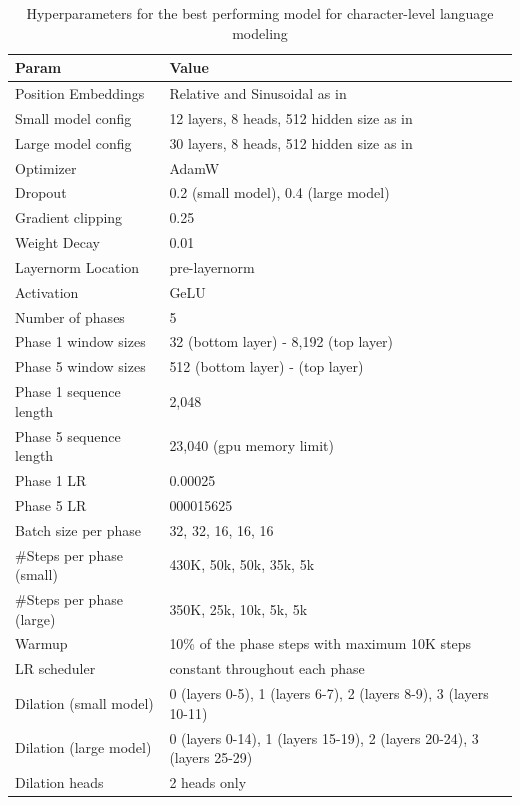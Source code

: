 \begin{table}
 \centering
 \small
\begin{tabular}{@{}ll@{}}
\toprule
Param & Value \\
\midrule
Position Embeddings & Relative and Sinusoidal as in~\citet{transformerxl} \\
Small model config & 12 layers, 8 heads, 512 hidden size as in~\citet{transformerxl} \\
Large model config & 30 layers, 8 heads, 512 hidden size as in~\citet{sparseOpenai} \\
Optimizer & AdamW \\
Dropout & 0.2 (small model), 0.4  (large model) \\
Gradient clipping & 0.25 \\
Weight Decay & 0.01 \\
Layernorm Location & pre-layernorm~\cite{layernorm} \\
Activation & GeLU \\
Number of phases & 5 \\
Phase 1 window sizes & 32 (bottom layer) - 8,192 (top layer) \\
Phase 5 window sizes & 512 (bottom layer) -  (top layer) \\
Phase 1 sequence length & 2,048 \\
Phase 5 sequence length & 23,040  (gpu memory limit) \\
Phase 1 LR & 0.00025 \\
Phase 5 LR & 000015625 \\
Batch size per phase & 32, 32, 16, 16, 16 \\
\#Steps per phase (small) & 430K, 50k, 50k, 35k, 5k \\
\#Steps per phase (large) & 350K, 25k, 10k, 5k, 5k \\
Warmup & 10\% of the phase steps with maximum 10K steps \\
LR scheduler & constant throughout each phase \\
Dilation (small model) & 0 (layers 0-5), 1 (layers 6-7), 2 (layers 8-9), 3 (layers 10-11) \\
Dilation (large model) & 0 (layers 0-14), 1 (layers 15-19), 2 (layers 20-24), 3 (layers 25-29) \\
Dilation heads & 2 heads only \\
\bottomrule
\end{tabular}
\caption{Hyperparameters for the best performing model for character-level language modeling}
\label{tab:char-hyperparams}
 \end{table}


